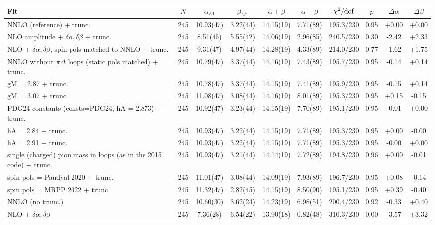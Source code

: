 \begin{tabular}{lccccccccc}
\hline
Fit & $N$ & $\alpha_{E1}$ & $\beta_{M1}$ & $\alpha+\beta$ & $\alpha-\beta$ & $\chi^2/{\rm dof}$ & $p$ & $\Delta\alpha$ & $\Delta\beta$ \\
\hline
NNLO (reference) + trunc. & 245 & 10.93(47) & 3.22(44) & 14.15(19) & 7.71(89) & 195.3/230 & 0.95 & +0.00 & +0.00 \\
NLO amplitude + $\delta\alpha,\delta\beta$ + trunc. & 245 & 8.51(45) & 5.55(42) & 14.06(19) & 2.96(85) & 240.5/230 & 0.30 & -2.42 & +2.33 \\
NLO + $\delta\alpha,\delta\beta$, spin pols matched to NNLO + trunc. & 245 & 9.31(47) & 4.97(44) & 14.28(19) & 4.33(89) & 214.0/230 & 0.77 & -1.62 & +1.75 \\
NNLO without $\pi\Delta$ loops (static pols matched) + trunc. & 245 & 10.79(47) & 3.37(44) & 14.16(19) & 7.43(89) & 195.7/230 & 0.95 & -0.14 & +0.14 \\
gM = 2.87 + trunc. & 245 & 10.78(47) & 3.37(44) & 14.15(19) & 7.41(89) & 195.9/230 & 0.95 & -0.15 & +0.14 \\
gM = 3.07 + trunc. & 245 & 11.08(47) & 3.08(44) & 14.16(19) & 8.01(89) & 195.3/230 & 0.95 & +0.15 & -0.15 \\
PDG24 constants (consts=PDG24, hA = 2.873) + trunc. & 245 & 10.92(47) & 3.23(44) & 14.15(19) & 7.70(89) & 195.1/230 & 0.95 & -0.01 & +0.00 \\
hA = 2.84 + trunc. & 245 & 10.93(47) & 3.22(44) & 14.15(19) & 7.71(89) & 195.3/230 & 0.95 & +0.00 & -0.00 \\
hA = 2.91 + trunc. & 245 & 10.93(47) & 3.22(44) & 14.15(19) & 7.71(89) & 195.3/230 & 0.95 & -0.00 & +0.00 \\
single (charged) pion mass in loops (as in the 2015 code) + trunc. & 245 & 10.93(47) & 3.21(44) & 14.14(19) & 7.72(89) & 194.8/230 & 0.96 & +0.00 & -0.01 \\
spin pols = Paudyal 2020 + trunc. & 245 & 11.01(47) & 3.08(44) & 14.09(19) & 7.93(89) & 196.7/230 & 0.95 & +0.08 & -0.14 \\
spin pols = MRPP 2022 + trunc. & 245 & 11.32(47) & 2.82(45) & 14.15(19) & 8.50(90) & 195.1/230 & 0.95 & +0.39 & -0.40 \\
NNLO (no trunc.) & 245 & 10.60(30) & 3.62(24) & 14.23(19) & 6.98(51) & 200.4/230 & 0.92 & -0.33 & +0.40 \\
NLO + $\delta\alpha,\delta\beta$ & 245 & 7.36(28) & 6.54(22) & 13.90(18) & 0.82(48) & 310.3/230 & 0.00 & -3.57 & +3.32 \\

\end{tabular}
